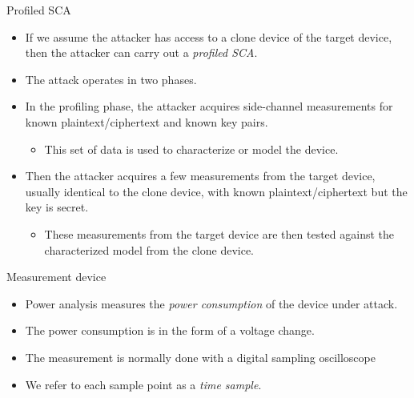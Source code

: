 \begin{frame}{Profiled SCA}
    \begin{itemize}
        \item If we assume the attacker has access to a clone device of the target device, then the attacker can carry out a \textit{profiled SCA}.
       \item The attack operates in two phases.
        \item In the profiling phase, the attacker acquires side-channel measurements for known plaintext/ciphertext and known key pairs.
        \begin{itemize}
            \item This set of data is used to characterize or model the device.
        \end{itemize}
        \item Then the attacker acquires a few measurements from the target device, usually identical to the clone device, with known plaintext/ciphertext but the key is secret.
        \begin{itemize}
            \item These measurements from the target device are then tested against the characterized model from the clone device.
        \end{itemize}
    \end{itemize}
\end{frame}

\begin{frame}{Measurement device}
    \begin{itemize}
        \item Power analysis measures the \textit{power consumption} of the device under attack.
        \item The power consumption is in the form of a voltage change.
        \item The measurement is normally done with a digital sampling oscilloscope
         \item We refer to each sample point as a \textit{time sample}.
    \end{itemize}
\end{frame}

